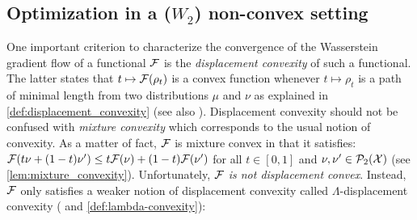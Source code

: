


\subsection{Optimization in a ($W_2$) non-convex setting}
\label{subsection:barrier_optimization}
One important criterion to characterize the convergence of the Wasserstein gradient flow of a functional ${{\mathcal F}}$ is the \textit{displacement convexity} of such a functional. The latter states that $t\mapsto {{\mathcal F}}(\rho_t)$ is a convex function whenever $t\mapsto\rho_t$ is a path of minimal length from two distributions $\mu$ and $\nu$ as explained in \cref{def:displacement_convexity} (see also \cite[Definition 16.5]{Villani:2004}). %
Displacement convexity should not be confused with \textit{mixture convexity} which corresponds to the usual notion of convexity. As a matter of fact, ${{\mathcal F}}$ is mixture convex in that it satisfies: ${{\mathcal F}}(t\nu +(1-t)\nu')\leq t{{\mathcal F}}(\nu)+(1-t){{\mathcal F}}(\nu')$ for all $t\in [0,1]$ and $\nu,\nu'\in\mathcal{P}_2({{\mathcal X}})$ (see \cref{lem:mixture_convexity}). Unfortunately, \textit{${{\mathcal F}}$ is not displacement convex}. Instead, ${{\mathcal F}}$ only satisfies a weaker notion of displacement convexity called $\Lambda$-displacement convexity (\cite[Definition 16.5]{Villani:2009} and  \cref{def:lambda-convexity}): 
